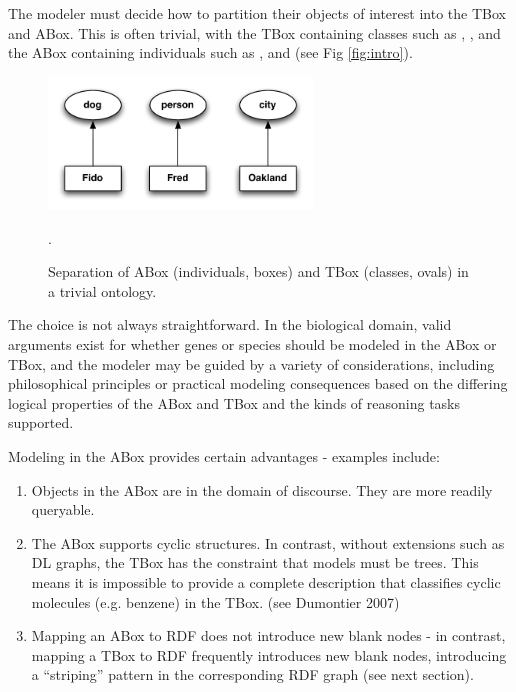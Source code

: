 \documentclass{my}
\begin{document}
The modeler must decide how to partition their objects of interest
into the TBox and ABox. This is often trivial, with the TBox
containing classes such as , ,  and the
ABox containing individuals such as ,  and
 (see Fig \ref{fig:intro}).

\begin{figure}
\center
\includegraphics[width=7cm]{intro}
\caption{Separation of ABox (individuals, boxes) and TBox (classes,
  ovals) in a trivial ontology. }.
\label{fig:into}
\end{figure}


The choice is not always straightforward. In the biological domain,
valid arguments exist for whether genes or species should be modeled
in the ABox or TBox, and the modeler may be guided by a variety of
considerations, including philosophical principles or practical
modeling consequences based on the differing logical properties of the
ABox and TBox and the kinds of reasoning tasks supported.

Modeling in the ABox provides certain advantages - examples include:

\begin{enumerate}

\item Objects in the ABox are in the domain of discourse. They are
  more readily queryable.

\item The ABox supports cyclic structures. In contrast, without
  extensions such as DL graphs, the TBox has the constraint that
  models must be trees. This means it is impossible to provide a
  complete description that classifies cyclic molecules (e.g. benzene)
  in the TBox. (see Dumontier 2007\cite{Dumontier2007})

\item Mapping an ABox to RDF does not introduce new blank nodes - in
  contrast, mapping a TBox to RDF frequently introduces new blank
  nodes, introducing a ``striping'' pattern in the corresponding RDF
  graph (see next section).

\end{enumerate}
\end{document}
